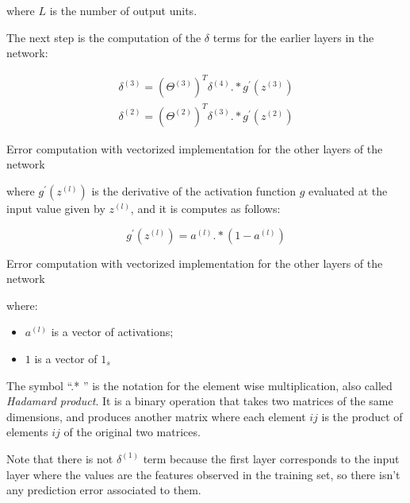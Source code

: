 where  $L$ is the number of output units.


The next step is the computation of the $\delta$ terms for the earlier layers in the network:

\begin{eqfloat}[H]
\begin{equation}
	\begin{aligned}
	\delta^{(3)} = (\Theta^{(3)})^T  \delta^{(4)} .* g^{\prime}(z^{(3)})\\
	\delta^{(2)} = (\Theta^{(2)})^T  \delta^{(3)} .* g^{\prime}(z^{(2)})
	\end{aligned}	
\end{equation}
      \addtocounter{equation}{-1}
        \caption{ Error computation with vectorized implementation for the other layers of the network}
        \label{eq:errcomp}
    \end{eqfloat}


where $g^{\prime}(z^{(l)})$ is the derivative of the activation function $g$ evaluated at the input value given by $z^{(l)}$, and it is computes as follows:

\begin{eqfloat}[H]
\begin{equation}
	g^{\prime}(z^{(l)}) = a^{(l)} .* (1 - a^{(l)})
\end{equation}
      \addtocounter{equation}{-1}
        \caption{ Error computation with vectorized implementation for the other layers of the network}
        \label{eq:errcomp}
    \end{eqfloat}
where:
\begin{itemize}
	\item $a^{(l)}$ is a vector of activations;
	\item $1$ is a vector of $1_s$
\end{itemize}

\begin{mydef} 
The symbol ``.* '' is the notation for the element wise multiplication, also called {\it Hadamard product}. It is a binary operation that takes two matrices of the same dimensions, and produces another matrix where each element $ij$ is the product of elements $ij$ of the original two matrices.
\end{mydef} 

Note that there is not $\delta^{(1)}$ term because the first layer corresponds to the input layer where the values are the features observed in the training set, so there isn't any prediction error associated to them.

